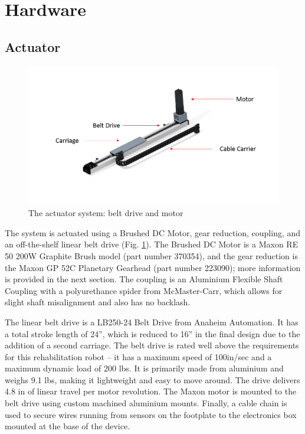\documentclass[12pt]{report}
\begin{document}
	\section{Hardware}
		\subsection{Actuator}	
		
	\begin{figure}[h] 
		\centering
		\includegraphics[width=\linewidth]{actuator}
		\caption{The actuator system: belt drive and motor}
		\label{fig:actuator}
	\end{figure}
		
		
	The system is actuated using a Brushed DC Motor, gear reduction, coupling, and an off-the-shelf linear belt drive (Fig. \ref{fig:actuator}). The Brushed DC Motor is a Maxon RE 50 200W Graphite Brush model (part number 370354), and the gear reduction is the Maxon GP 52C Planetary Gearhead (part number 223090); more information is provided in the next section. The coupling is an Aluminium Flexible Shaft Coupling with a polyurethance spider from McMaster-Carr, which allows for slight shaft misalignment and also has no backlash. 
	
	The linear belt drive is a LB250-24 Belt Drive from Anaheim Automation. It has a total stroke length of 24'', which is reduced to 16'' in the final design due to the addition of a second carriage. The belt drive is rated well above the requirements for this rehabilitation robot -- it has a maximum speed of 100in/sec and a maximum dynamic load of 200 lbs. It is primarily made from aluminium and weighs 9.1 lbs, making it lightweight and easy to move around. The drive delivers 4.8 in of linear travel per motor revolution. The Maxon motor is mounted to the belt drive using custom machined aluminium mounts. Finally, a cable chain is used to secure wires running from sensors on the footplate to the electronics box mounted at the base of the device. 
	
\end{document}
